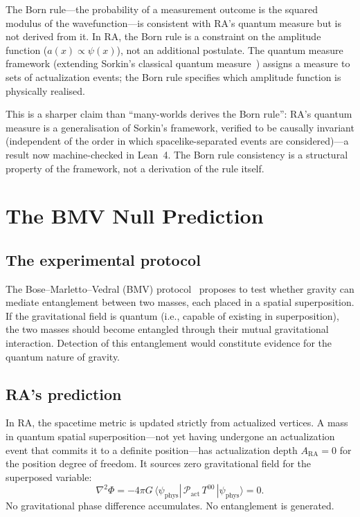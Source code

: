 \documentclass[11pt,a4paper]{article}
\theoremstyle{plain}
\theoremstyle{definition}
\theoremstyle{remark}
\newcommand{\Pact}{\mathcal{P}_{\mathrm{act}}}
\begin{document}
The Born rule---the probability of a measurement outcome is the squared modulus of
the wavefunction---is consistent with RA's quantum measure but is not derived from
it.  In RA, the Born rule is a constraint on the amplitude function
($a(x) \propto \psi(x)$), not an additional postulate.  The quantum measure
framework (extending Sorkin's classical quantum measure~\cite{Sorkin1994}) assigns a
measure to sets of actualization events; the Born rule specifies which amplitude
function is physically realised.

This is a sharper claim than ``many-worlds derives the Born rule'': RA's quantum
measure is a generalisation of Sorkin's framework, verified to be causally invariant
(independent of the order in which spacelike-separated events are considered)---a
result now machine-checked in Lean~4.  The Born rule consistency is a structural
property of the framework, not a derivation of the rule itself.

\section{The BMV Null Prediction}\label{sec:bmv}

\subsection{The experimental protocol}\label{sec:bmv-protocol}

The Bose--Marletto--Vedral (BMV) protocol~\cite{Bose2017,Marletto2017} proposes to
test whether gravity can mediate entanglement between two masses, each placed in a
spatial superposition.  If the gravitational field is quantum (i.e., capable of
existing in superposition), the two masses should become entangled through their
mutual gravitational interaction.  Detection of this entanglement would constitute
evidence for the quantum nature of gravity.

\subsection{RA's prediction}\label{sec:bmv-prediction}

In RA, the spacetime metric is updated strictly from actualized vertices.  A mass in
quantum spatial superposition---not yet having undergone an actualization event that
commits it to a definite position---has actualization depth $A_{\mathrm{RA}} = 0$
for the position degree of freedom.  It sources zero gravitational field for the
superposed variable:
\begin{equation}
\nabla^2 \Phi = -4\pi G\,\langle\psi_{\mathrm{phys}}|\,\Pact\,
T^{00}\,|\psi_{\mathrm{phys}}\rangle = 0.
\label{eq:bmv}
\end{equation}
No gravitational phase difference accumulates.  No entanglement is generated.
\end{document}
